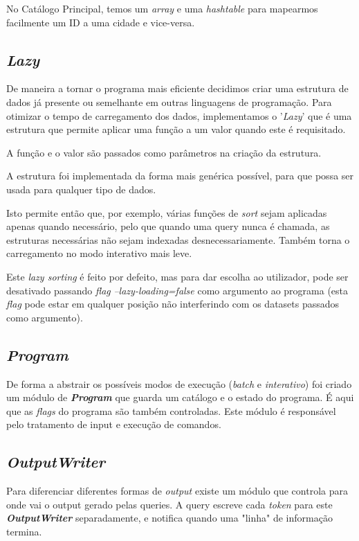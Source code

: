\documentclass{article}
\begin{document}
            No Catálogo Principal, temos um \textit{array} e uma \textit{hashtable} para mapearmos facilmente um ID a uma cidade e vice-versa.       
            
        \subsection{\emph{Lazy}}
            De maneira a tornar o programa mais eficiente decidimos criar uma
            estrutura de dados já presente ou semelhante em outras linguagens de programação.
            Para otimizar o tempo de carregamento dos dados, implementamos o '\emph{Lazy}' que é uma
            estrutura que permite aplicar uma função a um valor quando este é requisitado.

            A função e o valor são passados como parâmetros na criação da estrutura.

            A estrutura foi implementada da forma mais genérica possível, para que
            possa ser usada para qualquer tipo de dados.

            Isto permite então que, por exemplo, várias funções de \emph{sort} sejam aplicadas
            apenas quando necessário, pelo que quando uma query nunca é chamada, as estruturas necessárias
            não sejam indexadas desnecessariamente. Também torna o carregamento no modo interativo
            mais leve. 

            Este \emph{lazy sorting} é feito por defeito, mas para dar escolha ao utilizador,
            pode ser desativado passando \emph{flag} \emph{--lazy-loading=false}
            como argumento ao programa (esta \emph{flag} pode estar em qualquer
            posição não interferindo com os datasets passados como argumento).
        \subsection{\emph{Program}}
            De forma a abstrair os possíveis modos de execução (\textit{batch} e \textit{interativo})
            foi criado um módulo de \textit{\textbf{Program}} que guarda um catálogo e o estado do programa.
            É aqui que as \textit{flags} do programa são também controladas.
            Este módulo é responsável pelo tratamento de input e execução de comandos.
        \subsection{\emph{OutputWriter}}
            Para diferenciar diferentes formas de \textit{output} existe um módulo que controla
            para onde vai o output gerado pelas queries.
            A query escreve cada \textit{token} para este \textit{\textbf{OutputWriter}} separadamente,
            e notifica quando uma "linha" de informação termina.
            
\end{document}
